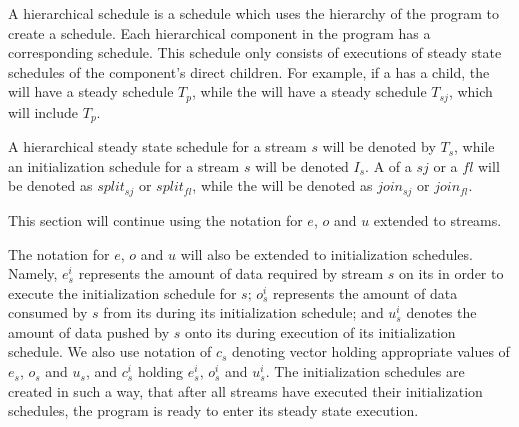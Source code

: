 A hierarchical schedule is a schedule which uses the hierarchy of
the program to create a schedule. Each hierarchical component in
the program has a corresponding schedule. This schedule only
consists of executions of steady state schedules of the
component's direct children. For example, if a {\splitjoin} has a
{\pipeline} child, the {\pipeline} will have a steady schedule $T_p$,
while the {\splitjoin} will have a steady schedule $T_{sj}$, which
will include $T_p$.

A hierarchical steady state schedule for a stream $s$ will be
denoted by $T_s$, while an initialization schedule for a stream
$s$ will be denoted $I_s$. A {\splitter} of a {\splitjoin} $sj$ or
a {\feedbackloop} $fl$ will be denoted as $split_{sj}$ or
$split_{fl}$, while the {\joiner} will be denoted as $join_{sj}$
or $join_{fl}$.

This section will continue using the notation for $e$, $o$ and $u$
extended to streams.
\begin{comment}
That is, for a stream $s$,
$e_s$ will represent the amount of data needed by $s$ on its
{\Input} {\Channel} in order to execute its minimal steady state
schedule; $o_s$ represents the amount of data consumed by from its
{\Input} {\Channel} $s$ during execution of its steady state
schedule; and $u_s$ represents the amount of data pushed by $s$
onto its {\Output} {\Channel}.
\end{comment}
The notation for $e$, $o$ and $u$ will also be extended to
initialization schedules.  Namely, $e^i_s$ represents the amount
of data required by stream $s$ on its {\Input} {\Channel} in
order to execute the initialization schedule for $s$; $o^i_s$
represents the amount of data consumed by $s$ from its {\Input}
{\Channel} during its initialization schedule; and $u^i_s$
denotes the amount of data pushed by $s$ onto its {\Output}
{\Channel} during execution of its initialization schedule. We
also use notation of $c_s$ denoting vector holding appropriate
values of $e_s$, $o_s$ and $u_s$, and $c^i_s$ holding $e^i_s$,
$o^i_s$ and $u^i_s$. The initialization schedules are created in
such a way, that after all streams have executed their
initialization schedules, the program is ready to enter its steady
state execution.

\begin{comment}
Note, that it is possible that a stream $s$ has $u^i_s \ne
0$. An example of this will be presented in Section
\ref{sec:sas-fl}.
\end{comment}

